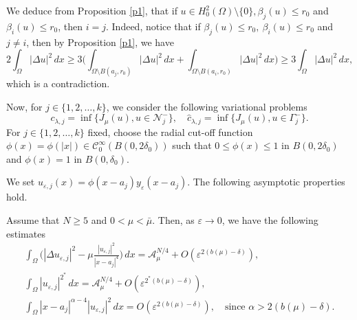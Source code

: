 \documentclass[reqno]{amsart}
\begin{document}
 \begin{remark}\label{RM} \rm
We deduce from Proposition \ref{p1}, that if 
\(u\in H^2_0(\Omega)\setminus\{0\}, \beta_j(u)\leq r_0\)  and \(\beta_i(u)\leq r_0\),
then \(i=j\). Indeed, notice that if \( \beta_j(u)\leq r_0, \ \beta_i(u)\leq r_0\) 
and \(j\neq i\), then by Proposition \ref{p1}, we have
 \[
 2\int_{\Omega} |\Delta u|^2\,dx 
 \geq 3 \Big( \int_{\Omega \setminus B(a_j, r_0)} |\Delta u|^2\,dx
 +\int_{\Omega \setminus B(a_i, r_0)} |\Delta u|^2\,dx\Big) 
 \geq 3\int_{\Omega} |\Delta u|^2\,dx,
 \]
which is a contradiction.
\end{remark}

 Now, for \(j\in \{1,2,\dots,k\}\), we consider the following variational problems
\[
 c_{\lambda, j}=\inf \{J_{\mu}(u), u\in \mathcal{N}_j^-\}, \quad
  \hat{c}_{\lambda, j}=\inf \{J_{\mu}(u), u\in \Gamma_j^-\}.
\]
For \(j\in \{1,2,\dots,k\}\) fixed, choose the radial cut-off function 
\(\phi(x)=\phi(|x|)\in \mathcal{C}^{\infty}_0(B(0,2\delta _0))\) such that 
\(0\leq \phi(x)\leq 1\) in \(B(0, 2\delta_0)\) and \(\phi(x)=1\) in \(B(0, \delta_0)\).

We set \(u_{\varepsilon, j}(x)= \phi(x-a_j) y_\varepsilon(x-a_j)\). 
The following asymptotic properties hold.

\begin{lemma}
Assume that \(N\geq 5\) and \(0<\mu<\bar {\mu}\). Then, as \(\varepsilon \to 0\), we
have the following estimates
\begin{gather} \label{a0}
 \int_{\Omega}\Big( |\Delta u_{\varepsilon, j}|^2-\mu \frac{|u_{\varepsilon, j}
  |^2}{|x-a_j|^4}\Big)\,dx =\mathcal{A}_{\mu}^{N/4}+O(\varepsilon^{2(b(\mu)
  -\delta)}), \\ 
  \label{a1}
  \int_{\Omega}| u_{\varepsilon, j}|^{2^*}\,dx =\mathcal{A}_{\mu}^{N/4}
  +O(\varepsilon^{2^*(b(\mu)-\delta)}), \\ 
  \label{a2}
  \int_{\Omega} |x-a_j|^{\alpha-4}| u_{\varepsilon, j}|^2\,dx 
  =O(\varepsilon^{2(b(\mu)-\delta)}), \quad \text{since }  \alpha> 2(b(\mu)-\delta).
\end{gather}
\end{lemma}
\end{document}
